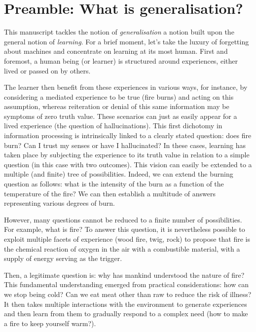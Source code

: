 \chapter*{Preamble: What is generalisation?}
\mtcaddchapter



This manuscript tackles the notion of \emph{generalisation} a notion built upon the general notion of \emph{learning}. For a brief moment, let's take the luxury of forgetting about machines and concentrate on learning at its most human. First and foremost, a human being (or learner) is structured around experiences, either lived or passed on by others. 

The learner then benefit from these experiences in various ways, for instance, by considering a mediated experience to be true (fire burns) and acting on this assumption, whereas reiteration or denial of this same information may be symptoms of zero truth value.  These scenarios can just as easily appear for a lived experience (the question of hallucinations). This first dichotomy in information processing is intrinsically linked to a clearly stated question: does fire burn? Can I trust my senses or have I hallucinated? In these cases, learning has taken place by subjecting the experience to its truth value in relation to a simple question (in this case with two outcomes).  This vision can easily be extended to a multiple (and finite) tree of possibilities. Indeed, we can extend the burning question as follows: what is the intensity of the burn as a function of the temperature of the fire? We can then establish a multitude of answers representing various degrees of burn. 

However, many questions cannot be reduced to a finite number of possibilities. For example, what is fire? To answer this question, it is nevertheless possible to exploit multiple facets of experience (wood fire, twig, rock) to propose that fire is the chemical reaction of oxygen in the air with a combustible material, with a supply of energy serving as the trigger. 

Then, a legitimate question is: why has mankind understood the nature of fire? This fundamental understanding emerged from practical considerations: how can we stop being cold? Can we eat meat other than raw to reduce the risk of illness? It then takes multiple interactions with the environment to generate experiences and then learn from them to gradually respond to a complex need (how to make a fire to keep yourself warm?).

